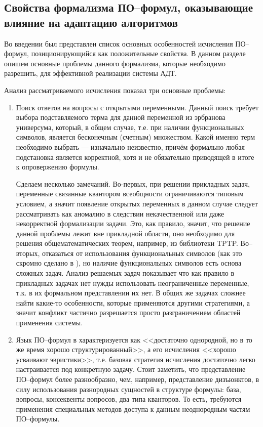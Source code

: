 \subsection{Свойства формализма ПО--формул, оказывающие влияние на адаптацию алгоритмов}
Во введении был представлен список основных особенностей исчисления ПО--формул, позиционирующийся как положительные свойства. В данном разделе опишем основные проблемы данного формализма, которые необходимо разрешить, для эффективной реализации системы АДТ.

Анализ рассматриваемого исчисления показал три основные проблемы:
\begin{enumerate}
\item {Поиск ответов на вопросы с открытыми переменными.} Данный поиск требует выбора подставляемого терма для данной переменной из эрбранова универсума, который, в общем случае, т.е. при наличии функциональных символов, является бесконечным (счетным) множеством. Какой именно терм необходимо выбрать --- изначально неизвестно, причём формально любая подстановка является корректной, хотя и не обязательно приводящей в итоге к опровержению формулы.

Сделаем несколько замечаний. Во-первых, при решении прикладных задач, переменные связанные квантором всеобщности ограничиваются типовым условием, а значит появление открытых переменных в данном случае следует рассматривать как аномалию в следствии некачественной или даже некорректной формализации задачи. Это, как правило, значит, что решение данной проблемы лежит вне прикладной области, оно необходимо для решения общематематических теорем, например, из библиотеки TPTP.  Во--вторых, отказаться от использования функциональных символов (как это скромно сделано в \cite{ICDS2000}), но наличие функциональных символов есть основа сложных задач. Анализ решаемых задач показывает что как правило в прикладных задачах нет нужды использовать неограниченные переменные, т.к. в их формальном представлении их нет. В общих же задачах сложнее найти какие-то особенности, которые применяются другими стратегиями, а значит конфликт частично разрешается просто разграничением областей применения системы.

\item Язык ПО--формул в \cite{ICDS2000} характеризуется как <<достаточно   однородной, но в то же время хорошо структурированный>>, а его исчисления  <<хорошо усваивают эвристики>>, т.е. базовая стратегия исчисления достаточно легко настраивается под конкретную задачу. Стоит заметить, что представление ПО--формул более разнообразно, чем, например, представление дизъюнктов, в силу использования разнородных сущностей в структуре формулы: база, вопросы, консеквенты вопросов, два типа кванторов. То есть, требуются применения специальных методов доступа к данным неоднородным частям ПО--формулы.


\end{enumerate}
